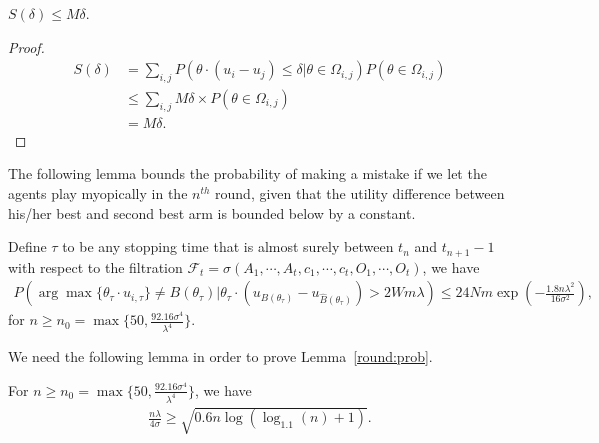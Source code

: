 \begin{lemma}
$S(\delta)\leq M\delta$.
\label{lemma:sdelta}
\end{lemma}

\begin{proof}
\begin{align*}
S(\delta)
  &=\sum_{i,j}P(\theta\cdot(u_{i}-u_{j})\le \delta|\theta\in \Omega_{i,j})P(\theta\in \Omega_{i,j}) \\
    &\leq \sum_{i,j}M\delta \times P(\theta\in \Omega_{i,j}) \\
    &=M\delta.
    \end{align*}
    \end{proof}

    The following lemma bounds the probability of making a mistake if we let the agents play myopically in the $n^{th}$ round, given that the utility difference between his/her best and second best arm is bounded below by a constant. 

    \begin{lemma}
    Define $\tau$ to be any stopping time that is almost surely between $t_n$ and $t_{n+1}-1$ with respect to the filtration $\mathcal{F}_{t}=\sigma(A_1,\cdots,A_t,c_1,\cdots,c_t,O_1,\cdots,O_t)$, we have 
    \begin{align}
    P(\arg\max\{\theta_{\tau}\cdot u_{i,\tau}\}\neq B(\theta_{\tau})|\theta_{\tau}\cdot(u_{B(\theta_{\tau})}-u_{\hat{B}(\theta_{\tau})})> 2Wm\lambda)\leq 24Nm\exp\left(-\frac{1.8n\lambda^2}{16\sigma^2}\right), \nonumber
    \end{align}
    for $n\geq n_{0}=\max\{50, \frac{92.16\sigma^4}{\lambda^4}\}$.
    \label{round:prob}
    \end{lemma}


    We need the following lemma in order to prove Lemma~\ref{round:prob}.

    \begin{lemma}
    For $n\geq n_{0}=\max\{50, \frac{92.16\sigma^4}{\lambda^4}\}$, we have
    \begin{align}
    \frac{n\lambda}{4\sigma}\geq \sqrt{0.6n\log(\log_{1.1}(n)+1)}. \nonumber
    \end{align}
    \label{n0-inequality}
    \end{lemma}


